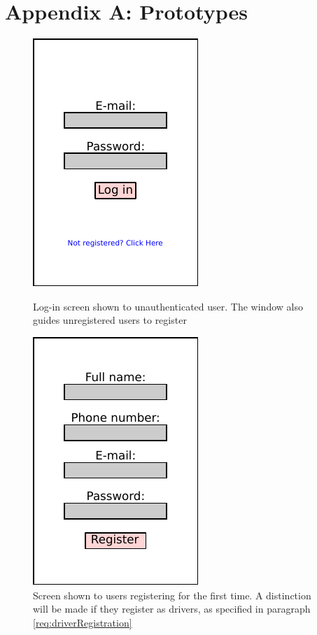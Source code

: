 \documentclass{article}
\begin{document}
\section{Appendix A: Prototypes}
\begin{figure}[!htpb]
    \centering
    \begin{minipage}{0.25\textwidth}
        \centering
        \includegraphics[scale=1]{login.pdf}
        \caption{Log-in screen shown to unauthenticated user. The window also guides unregistered users to register}
        \label{fig:login}
    \end{minipage}\hfill
    \begin{minipage}{0.25\textwidth}
        \centering
        \includegraphics[scale=1]{register.pdf}
        \caption{Screen shown to users registering for the first time. A distinction will be made if they register as drivers, as specified in paragraph \ref{req:driverRegistration}}

\end{minipage}
\end{figure}
\end{document}
